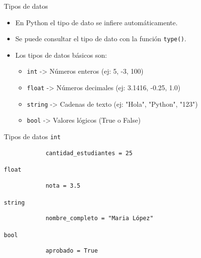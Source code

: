 \documentclass{beamer}
\begin{document}
    \begin{frame}{Tipos de datos}
        \begin{itemize}
            \item En Python el tipo de dato se infiere automáticamente.
            \item Se puede consultar el tipo de dato con la función \texttt{type()}.
            \item Los tipos de datos básicos son: 
            \begin{itemize}
                \item \texttt{int} -> Números enteros (ej: 5, -3, 100)
                \item \texttt{float} -> Números decimales (ej: 3.1416, -0.25, 1.0)
                \item \texttt{string} -> Cadenas de texto (ej: "Hola", "Python", "123")
                \item \texttt{bool} -> Valores lógicos (True o False)
            \end{itemize}
        \end{itemize}
    \end{frame}

    \begin{frame}[fragile,t]{Tipos de datos}
        \texttt{int}
        \begin{verbatim}
            cantidad_estudiantes = 25
        \end{verbatim}
        \texttt{float}
        \begin{verbatim}
            nota = 3.5
        \end{verbatim}
        \texttt{string}
        \begin{verbatim}
            nombre_completo = "Maria López"
        \end{verbatim}
        \texttt{bool}
        \begin{verbatim}
            aprobado = True
        \end{verbatim}
    \end{frame}
\end{document}
